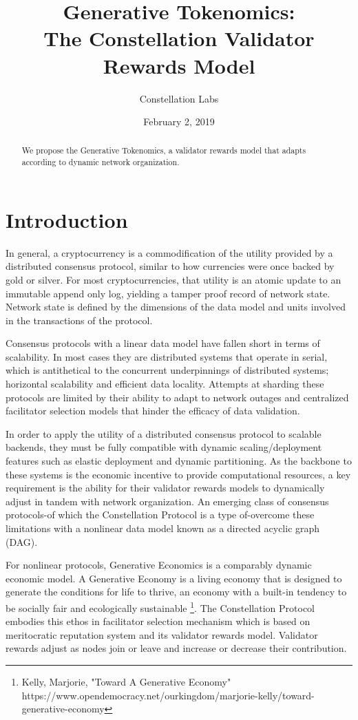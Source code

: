 \documentclass{article}
\title{Generative Tokenomics:\\ The Constellation Validator Rewards Model}
\author{Constellation Labs}
\date{February 2, 2019}
\begin{document}
\maketitle

\begin{abstract}
We propose the Generative Tokenomics, a validator rewards model that adapts according to dynamic network organization.
\end{abstract}
\setcounter{secnumdepth}{0}
\section{Introduction}
In general, a cryptocurrency is a commodification of the utility provided by a distributed consensus protocol, similar to how currencies were once backed by gold or silver. For most cryptocurrencies, that utility is an atomic update to an immutable append only log, yielding a tamper proof record of network state. Network state is defined by the dimensions of the data model and units involved in the transactions of the protocol. 

Consensus protocols with a linear data model have fallen short in terms of scalability. In most cases they are distributed systems that operate in serial, which is antithetical to the concurrent underpinnings of distributed systems; horizontal scalability and efficient data locality. Attempts at sharding these protocols are limited by their ability to adapt to network outages and centralized facilitator selection models that hinder the efficacy of data validation. 

In order to apply the utility of a distributed consensus protocol to scalable backends, they must be fully compatible with dynamic scaling/deployment features such as elastic deployment and dynamic partitioning. As the backbone to these systems is the economic incentive to provide computational resources, a key requirement is the ability for their validator rewards models to dynamically adjust in tandem with network organization. An emerging class of consensus protocols-of which the Constellation Protocol is a type of-overcome these limitations with a nonlinear data model known as a directed acyclic graph (DAG).

For nonlinear protocols, Generative Economics is a comparably dynamic economic model. A Generative Economy is a living economy that is designed to generate the conditions for life to thrive, an economy with a built-in tendency to be socially fair and ecologically sustainable \footnote{Kelly, Marjorie, "Toward A Generative Economy" https://www.opendemocracy.net/ourkingdom/marjorie-kelly/toward-generative-economy}. The Constellation Protocol embodies this ethos in facilitator selection mechanism which is based on meritocratic reputation system and its validator rewards model. Validator rewards adjust as nodes join or leave and increase or decrease their contribution.
\end{document}

